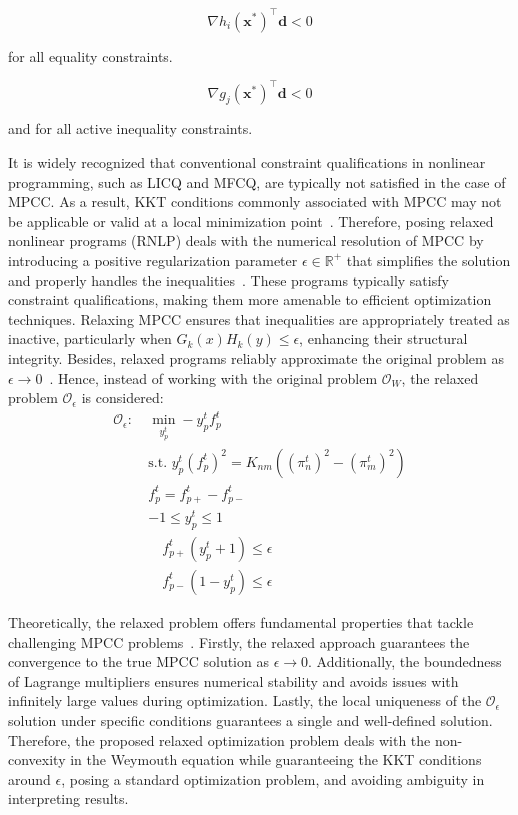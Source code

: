  \begin{equation}
    \nabla h_i(\mathbf{x}^*)^\top \mathbf{d} < 0    
 \end{equation}
  
for all equality constraints.


\begin{equation}
    \nabla g_j(\mathbf{x}^*)^\top \mathbf{d} < 0    
\end{equation}

and for all active inequality constraints.  
 

It is widely recognized that conventional constraint qualifications in nonlinear programming, such as LICQ and MFCQ, are typically not satisfied in the case of MPCC. As a result, KKT conditions commonly associated with MPCC may not be applicable or valid at a local minimization point~\citep{Bouza_Still_2007}. Therefore, posing relaxed nonlinear programs (RNLP)  deals with the numerical resolution of MPCC by introducing a positive regularization parameter $\epsilon\in\mathbb{R}^+$ that simplifies the solution and properly handles the inequalities~\citep{Scholtes_2001}. These programs typically satisfy constraint qualifications, making them more amenable to efficient optimization techniques. Relaxing MPCC ensures that inequalities are appropriately treated as inactive, particularly when $G_k(x)H_k(y) \leq \epsilon$, enhancing their structural integrity. Besides, relaxed programs  reliably approximate the original problem as $\epsilon\to0$~\citep{Scheel_Scholtes_2000}. Hence, instead of working with the original problem $\mathcal{O}_W$, the relaxed problem $\mathcal{O}_\epsilon$ is considered:
\begin{subequations}
\begin{alignat}{4}
\label{eq:complementarity_relaxec1}
\mathcal{O}_\epsilon: \ &\min\limits_{y_p^t} -y_p^tf_{p}^t \\
&\text{s.t. } y_p^t(f_{p}^t)^2 = K_{nm}((\pi_{n}^t)^2-(\pi_{m}^t)^2)\\
&f_{p}^t = f_{p+}^t - f_{p-}^t\\
& -1 \leq y_p^t \leq 1 \\
&\quad f_{p+}^t(y_p^t+1) \leq \epsilon\label{eq:Oe:complementarity1} \\ \label{eq:Oe:complementarity2}
&\quad f_{p-}^t(1-y_p^t) \leq \epsilon
\end{alignat}
\end{subequations}


Theoretically, the relaxed problem offers fundamental properties that tackle challenging MPCC problems~\citep{Ralph_Wright_2004}. Firstly, the relaxed approach guarantees the convergence to the true MPCC solution as $\epsilon\to0$. Additionally, the boundedness of Lagrange multipliers ensures numerical stability and avoids issues with infinitely large values during optimization. Lastly, the local uniqueness of the $\mathcal{O}_{\epsilon}$ solution under specific conditions guarantees a single and well-defined solution. Therefore, the proposed relaxed optimization problem deals with the non-convexity in the Weymouth equation while guaranteeing the KKT conditions around $\epsilon$, posing a standard optimization problem, and avoiding ambiguity in interpreting results.

